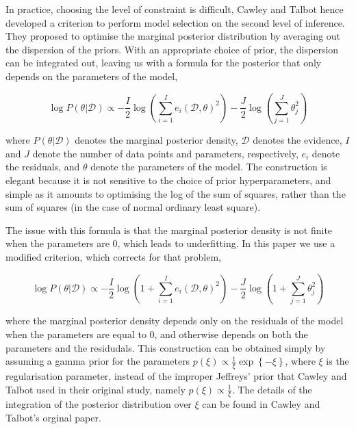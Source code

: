 \documentclass[11pt, oneside]{article}
\begin{document}
In practice, choosing the level of constraint is difficult, Cawley and Talbot hence developed a criterion to perform model selection on the second level of inference.
They proposed to optimise the marginal posterior distribution by averaging out the dispersion of the priors.
With an appropriate choice of prior, the dispersion can be integrated out, leaving us with a formula for the posterior that only depends on the parameters of the model,

\begin{equation}
	\log P(\theta | \mathcal{D}) \propto - \frac{I}{2} \log \left(\sum_{i=1}^{I} e_i(\mathcal{D},\theta)^2\right) - \frac{J}{2} \log \left(\sum_{j=1}^{J} \theta_{j}^2 \right)
\end{equation}

where $P(\theta|\mathcal{D})$ denotes the marginal posterior density, $\mathcal{D}$ denotes the evidence, $I$ and $J$ denote the number of data points and parameters, respectively, $e_i$ denote the residuals, and $\theta$ denote the parameters of the model.
The construction is elegant because it is not sensitive to the choice of prior hyperparameters, and simple as it amounts to optimising the log of the sum of squares, rather than the sum of squares (in the case of normal ordinary least square).

The issue with this formula is that the marginal posterior density is not finite when the parameters are 0, which leads to underfitting.
In this paper we use a modified criterion, which corrects for that problem,

\begin{equation}
	\log P(\theta | \mathcal{D}) \propto - \frac{I}{2} \log \left(1 + \sum_{i=1}^{I} e_i(\mathcal{D},\theta)^2\right) - \frac{J}{2} \log \left(1 + \sum_{j=1}^{J} \theta_{j}^2 \right)
\end{equation}

where the marginal posterior density depends only on the residuals of the model when the parameters are equal to 0, and otherwise depends on both the parameters and the residudals. 
This construction can be obtained simply by assuming a gamma prior for the parameters $p(\xi) \propto \frac{1}{\xi} \exp\left\{- \xi \right\}$, where $\xi$ is the regularisation parameter, instead of the improper Jeffreys' prior that Cawley and Talbot used in their original study, namely $p(\xi) \propto \frac{1}{\xi}$. 
The details of the integration of the posterior distribution over $\xi$ can be found in Cawley and Talbot's orginal paper.
\end{document}
